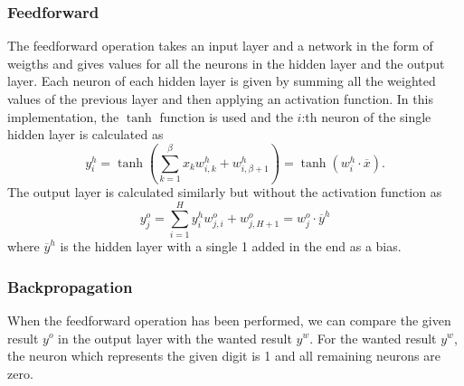 \documentclass[report.tex]{subfile}
\begin{document}
\subsubsection{Feedforward}
The feedforward operation takes an input layer and a network in the form of
weigths and gives values for all the neurons in the hidden layer and the output
layer. Each neuron of each hidden layer is given by summing all the weighted
values of the previous layer and then applying an activation function. In this
implementation, the $\tanh$ function is used and the $i$:th neuron of the
single hidden layer is calculated as
\begin{equation*}
    y^h_i = \tanh \left(
                    \sum_{k=1}^{\beta} x_k w^h_{i,k} + w^h_{i,\beta+1}
                   \right)
           = \tanh \left( w^h_i \cdot \overline x \right).
\end{equation*}
The output layer is calculated similarly but without the activation function as
\begin{equation*}
    y^o_j = \sum_{i=1}^{H} y^h_i w^o_{j,i} + w^o_{j,H+1}
          = w^o_j \cdot \overline y^h
\end{equation*}
where $\overline y^h$ is the hidden layer with a single 1 added in the end as a
bias.

\subsubsection{Backpropagation}
When the feedforward operation has been performed, we can compare the given
result $y^o$ in the output layer with the wanted result $y^w$. For the wanted
result $y^w$, the neuron which represents the given digit is 1 and all
remaining neurons are zero.
\end{document}
